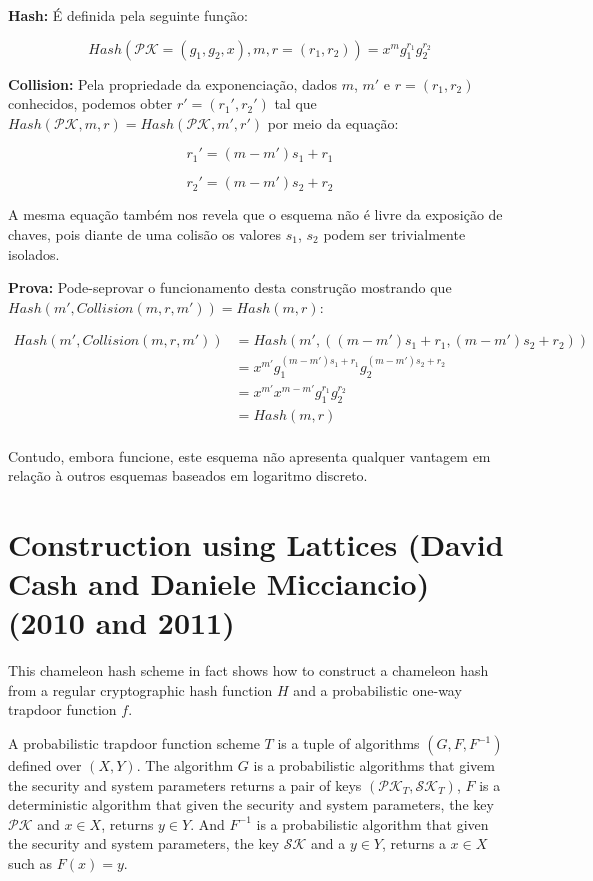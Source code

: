 \documentclass[a4paper]{article}
\begin{document}
 \textbf{Hash: } É definida pela seguinte função:
 
 $$
 Hash(\mathcal{PK}=(g_1, g_2, x), m, r=(r_1, r_2)) = x^mg_1^{r_1}g_2^{r_2}
 $$
 
 \textbf{Collision: } Pela propriedade da exponenciação, dados $m$,
 $m'$ e $r=(r_1, r_2)$ conhecidos, podemos obter $r'=(r_1', r_2')$ tal
 que $Hash(\mathcal{PK}, m, r) = Hash(\mathcal{PK}, m', r')$ por meio
 da equação:
 
 $$
 r_1' = (m-m')s_1+r_1
 $$
 
 $$
 r_2' = (m-m')s_2+r_2
 $$
 
 A mesma equação também nos revela que o esquema não é livre da
 exposição de chaves, pois diante de uma colisão os valores $s_1$,
 $s_2$ podem ser trivialmente isolados.
 
 \textbf{Prova: }Pode-seprovar o funcionamento desta construção
 mostrando que $Hash(m', Collision(m, r, m')) = Hash(m, r)$:
 
 \begin{equation}
 \begin{split}
 Hash(m', Collision(m, r, m'))
 &= Hash(m', ((m-m')s_1+r_1, (m-m')s_2+r_2))\\
 &= x^{m'}g_1^{(m-m')s_1+r_1}g_2^{(m-m')s_2+r_2}\\
 &= x^{m'}x^{m-m'}g_1^{r_1}g_2^{r_2}\\
 &= Hash(m, r)\\
 \end{split}
 \end{equation}
 
 Contudo, embora funcione, este esquema não apresenta qualquer vantagem
 em relação à outros esquemas baseados em logaritmo discreto.
 
 \section{Construction using Lattices (David Cash and Daniele Micciancio)
 (2010 and 2011)\cite{reticulado}\cite{micciancio2012trapdoors}}
 
 This chameleon hash scheme in fact shows how to construct a chameleon
 hash from a regular cryptographic hash function $H$ and a
 probabilistic one-way trapdoor function $f$.
 
 A probabilistic trapdoor function scheme $T$ is a tuple of algorithms
 $(G, F, F^{-1})$ defined over $(X, Y)$. The algorithm $G$ is a
 probabilistic algorithms that givem the security and system
 parameters returns a pair of keys $(\mathcal{PK}_T, \mathcal{SK}_T)$,
 $F$ is a deterministic algorithm that given the security and system
 parameters, the key $\mathcal{PK}$ and $x \in X$, returns $y \in
 Y$. And $F^{-1}$ is a probabilistic algorithm that given the security
 and system parameters, the key $\mathcal{SK}$ and a $y \in Y$,
 returns a $x \in X$ such as $F(x)=y$.
 
\end{document}
